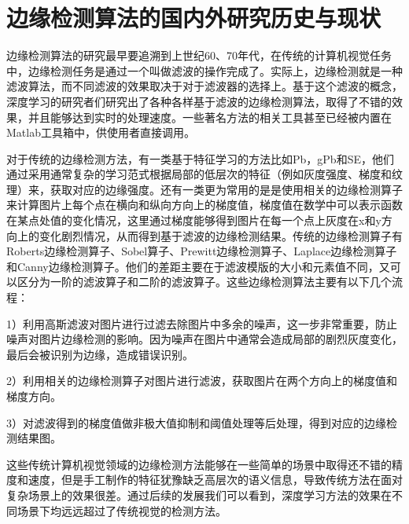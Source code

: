 \documentclass[master]{thesis-uestc}
\begin{document}


\section{边缘检测算法的国内外研究历史与现状}
边缘检测算法的研究最早要追溯到上世纪60、70年代，在传统的计算机视觉任务中，边缘检测任务是通过一个叫做滤波的操作完成了。实际上，边缘检测就是一种滤波算法，而不同滤波的效果取决于对于滤波器的选择上。基于这个滤波的概念，深度学习的研究者们研究出了各种各样基于滤波的边缘检测算法，取得了不错的效果，并且能够达到实时的处理速度。一些著名方法的相关工具甚至已经被内置在Matlab工具箱中，供使用者直接调用。

对于传统的边缘检测方法，有一类基于特征学习的方法比如Pb，gPb和SE，他们通过采用通常复杂的学习范式根据局部的低层次的特征（例如灰度强度、梯度和纹理）来，获取对应的边缘强度。还有一类更为常用的是是使用相关的边缘检测算子来计算图片上每个点在横向和纵向方向上的梯度值，梯度值在数学中可以表示函数在某点处值的变化情况，这里通过梯度能够得到图片在每一个点上灰度在x和y方向上的变化剧烈情况，从而得到基于滤波的边缘检测结果。传统的边缘检测算子有Roberts边缘检测算子、Sobel算子、Prewitt边缘检测算子、Laplace边缘检测算子和Canny边缘检测算子。他们的差距主要在于滤波模版的大小和元素值不同，又可以区分为一阶的滤波算子和二阶的滤波算子。这些边缘检测算法主要有以下几个流程：

1）利用高斯滤波对图片进行过滤去除图片中多余的噪声，这一步非常重要，防止噪声对图片边缘检测的影响。因为噪声在图片中通常会造成局部的剧烈灰度变化，最后会被识别为边缘，造成错误识别。

2）利用相关的边缘检测算子对图片进行滤波，获取图片在两个方向上的梯度值和梯度方向。

3）对滤波得到的梯度值做非极大值抑制和阈值处理等后处理，得到对应的边缘检测结果图。

这些传统计算机视觉领域的边缘检测方法能够在一些简单的场景中取得还不错的精度和速度，但是手工制作的特征犹豫缺乏高层次的语义信息，导致传统方法在面对复杂场景上的效果很差。通过后续的发展我们可以看到，深度学习方法的效果在不同场景下均远远超过了传统视觉的检测方法。
\end{document}
